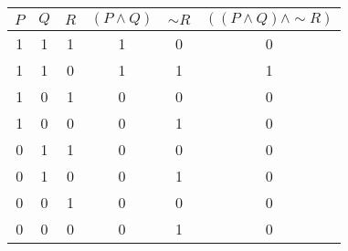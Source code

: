 \begin{tabular}{|c|c|c||c|c|c|}
\hline
$ P $ & $ Q $ & $ R $ & $ (P \wedge Q) $ & $  \sim R $ & $ ((P \wedge Q) \wedge  \sim R) $ \\
\hline
1 & 1 & 1 & 1 & 0 & 0 \\
1 & 1 & 0 & 1 & 1 & 1 \\
1 & 0 & 1 & 0 & 0 & 0 \\
1 & 0 & 0 & 0 & 1 & 0 \\
0 & 1 & 1 & 0 & 0 & 0 \\
0 & 1 & 0 & 0 & 1 & 0 \\
0 & 0 & 1 & 0 & 0 & 0 \\
0 & 0 & 0 & 0 & 1 & 0 \\
\hline
\end{tabular}
